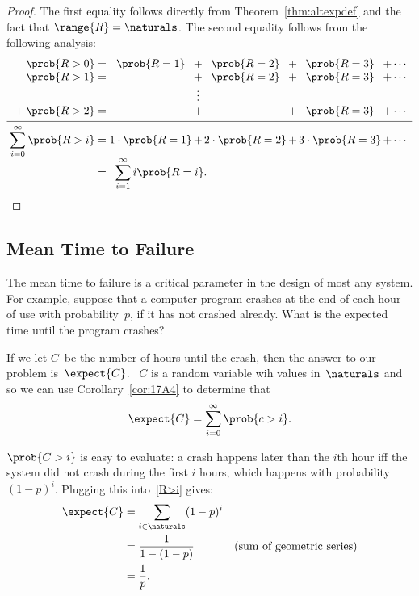 \begin{proof}
The first equality follows directly from Theorem~\ref{thm:altexpdef}
and the fact that $\range{R} = \naturals$.  The second equality
follows from the following analysis:
\begin{equation*}
\begin{array}{c@{}r@{\;}c@{\;}c@{\,}c@{\,}c@{\,}c@{\,}c@{\,}c@{\,}c}
      & \prob{R > 0} &=&
            \prob{R = 1} &+& \prob{R = 2} &+& \prob{R = 3} &+& \cdots\\
      & \prob{R > 1} &=&
                         &+& \prob{R = 2} &+& \prob{R = 3} &+& \cdots\\
      & &&&\vdots \\
{}+{} & \prob{R > 2} &=&
                         &+&              &+& \prob{R = 3} &+&
            \cdots\\[\jot]
\hline\noalign{\vskip\jot}
      & \llap{$\displaystyle\sum_{i = 0}^\infty \prob{R > i}$} &=&
            1 \cdot \prob{R = 1} &+& 2 \cdot \prob{R = 2}
                &+& 3 \cdot \prob{R = 3} &+& \cdots\\[\jot]
      & &=& \multicolumn{7}{l}{\displaystyle\sum_{i = 1}^\infty i \prob{R = i}.}
\qedhere
\end{array}
\end{equation*}
\end{proof}

\subsection{Mean Time to Failure}\label{mean_time_to_failure_subsec}

The mean time to failure is a critical parameter in the design of most
any system.  For example, suppose that a computer program crashes at
the end of each hour of use with probability~$p$, if it has not
crashed already.  What is the expected time until the program crashes?

If we let $C$~be the number of hours until the crash, then the answer
to our problem is~$\expect{C}$.  \ $C$ is a random variable wih values
in~$\naturals$ and so we can use Corollary~\ref{cor:17A4} to determine
that
\begin{equation}\label{eqn:17:16.7}
    \expect{C} = \sum_{i = 0}^\infty \prob{c > i}.
\end{equation}

$\prob{C > i}$ is easy to evaluate: a crash happens later than the
$i$th hour iff the system did not crash during the first $i$ hours,
which happens with probability $(1-p)^i$.  Plugging this
into~\eqref{R>i} gives:
%
\begin{align}
\expect{C} & = \sum_{i \in \naturals} (1-p)^i \notag\\
       & = \frac{1}{1 - (1-p)} & \text{(sum of geometric series)}\notag\\
       & = \frac{1}{p}. \label{eqn:17T10}
\end{align}


